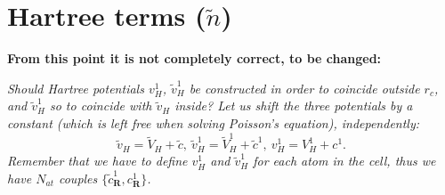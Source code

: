 \documentclass[a4paper,twocolumn,12pt]{article}
\begin{document}
\section*{Hartree terms ($\tilde{n}$)}


{\bf From this point it is not completely correct, to be changed:}
{\small\sl%
Should Hartree potentials $v^1_{H}$, $\tilde{v}^1_{H}$ be constructed
in order to coincide outside $r_c$, and $\tilde{v}^1_{H}$ so to
coincide with $\tilde{v}_{H}$ inside?  Let us shift the three
potentials by a constant (which is left free when solving Poisson's
equation), independently:
\begin{equation}
\tilde{v}_{H}=\tilde{V}_{H}+\tilde{c},\ 
\tilde{v}^1_{H}=\tilde{V}^1_{H}+\tilde{c}^1,\ 
{v}^1_{H}={V}^1_{H}+{c}^1.
\end{equation}
Remember that we have to define $v^1_{H}$ and $\tilde{v}^1_{H}$ for
each atom in the cell, thus we have $N_{at}$ couples $\{\tilde{c}^1_{\mathbf{R}},{c}^1_{\mathbf{R}}\}$.

}
\end{document}
